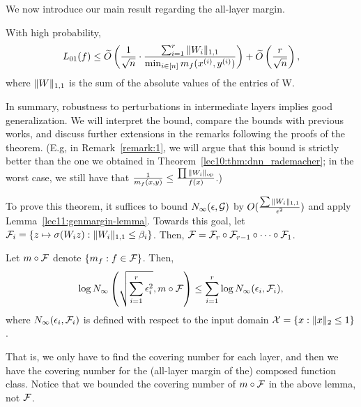We now introduce our main result regarding the all-layer margin.
\begin{theorem} \label{lec11:thm:poly_gen_bound_deep_nets}
With high probability,
\begin{equation}
L_{01}(f) \leq \widetilde{O}\left (\frac{1}{\sqrt{n}} \cdot \frac{\sum_{i=1}^r \|W_i\|_{1, 1}}{\min_{i \in [n]} m_f(x^{(i)}, y^{(i)})}\right ) + \widetilde{O}\left (\frac{r}{\sqrt{n}}\right ),
\end{equation}
where
$\|W\|_{1, 1}$ is the sum of the absolute values of the entries of W.
\end{theorem}
In summary, robustness to perturbations in intermediate layers implies good generalization. We will interpret the bound, compare the bounds with previous works, and discuss further extensions in the remarks following the proofs of the theorem.  (E.g, in Remark~\ref{remark:1}, we will argue that this bound is strictly better than the one we obtained in Theorem~\ref{lec10:thm:dnn_rademacher}; in the worst case, we still have that $\frac{1}{m_f(x, y)} \leq \frac{\prod \|W_i\|_{\text{op}}}{f(x)}$.)

To prove this theorem, it suffices to bound $N_\infty(\epsilon, \mathcal G)$ by $O(\frac{\sum{\|W_i\|_{1, 1}}}{\epsilon^2})$ and apply Lemma~\ref{lec11:genmargin-lemma}. Towards this goal, let $\mathcal F_i = \{ z \mapsto \sigma (W_i z) : \|W_i\|_{1, 1} \leq \beta_i \}$. Then, $\mathcal F = \mathcal F_r \circ \mathcal F_{r-1} \circ \cdots \circ \mathcal F_1$. 

\begin{lemma}\label{lec11:lma:decomp}
Let $m \circ \mathcal F$ denote $\{m_f : f \in \mathcal F \}$. Then, 
\begin{equation}
\log N_\infty\left (\sqrt{\sum_{i=1}^r \epsilon_i^2}, m \circ \mathcal F \right ) \leq \sum_{i=1}^r \log N_\infty(\epsilon_i, \mathcal F_i),
\end{equation}
where $N_\infty(\epsilon_i, \mathcal F_i)$ is defined with respect to the input domain $\mathcal{X} = \{x : \|x\|_2 \leq 1 \}$.
\end{lemma}

That is, we only have to find the covering number for each layer, and then we have the covering number for the (all-layer margin of the) composed function class. Notice that we bounded the covering number of $m \circ \mathcal F$ in the above lemma, not $\mathcal F$.

